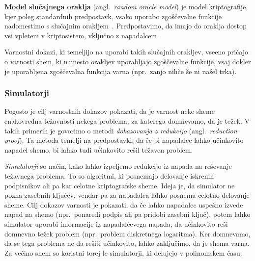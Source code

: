 \documentclass[isrm2, tisk]{fmfdelo}
\begin{document}
\textbf{Model slučajnega oraklja} (angl.\ \textit{random oracle model}) je model kriptografije, kjer poleg 
standardnih predpostavk, vsako uporabo zgoščevalne funkcije nadomestimo s slučajnim 
orakljem~\cite{boneh2023appcry}. Predpostavimo, da imajo do oraklja dostop vsi vpleteni v kriptosistem, 
vključno z napadalcem.

Varnostni dokazi, ki temeljijo na uporabi takih slučajnih orakljev, vseeno pričajo o varnosti shem,
ki namesto orakljev uporabljajo zgoščevalne funkcije, vsaj dokler je uporabljena zgoščevalna funkcija
varna (npr.\ zanjo nihče še ni našel trka).

\subsubsection{Simulatorji}
Pogosto je cilj varnostnih dokazov pokazati, da je varnost neke sheme enakovredna težavnosti nekega
problema, za katerega domnevamo, da je težek. V takih primerih je govorimo o metodi
\textit{dokazovanja z redukcijo} (angl.\ \textit{reduction proof}). Ta metoda temelji na
predpostavki, da če bi napadalec lahko učinkovito napadel shemo, bi lahko tudi učinkovito rešil težaven
problem.

\textit{Simulatorji} so način, kako lahko izpeljemo redukcijo iz napada na reševanje težavnega problema.
To so algoritmi, ki posnemajo delovanje iskrenih podpisnikov ali pa kar celotne kriptografske sheme.
Ideja je, da simulator ne pozna zasebnih ključev, vendar pa za napadalca lahko posnema celotno
delovanje sheme. Cilj dokazov varnosti je pokazati, da če lahko napadalec uspešno izvede napad na
shemo (npr.\ ponaredi podpis ali pa pridobi zasebni ključ), potem lahko simulator uporabi informacije
iz napadalčevega napada, da učinkovito reši domnevno težek problem (npr.\ problem diskretnega logaritma).
Ker domnevamo, da se tega problema ne da rešiti učinkovito, lahko zaključimo, da je shema varna.
Za večino shem so koristni torej le simulatorji, ki delujejo v polinomskem času.
\end{document}
